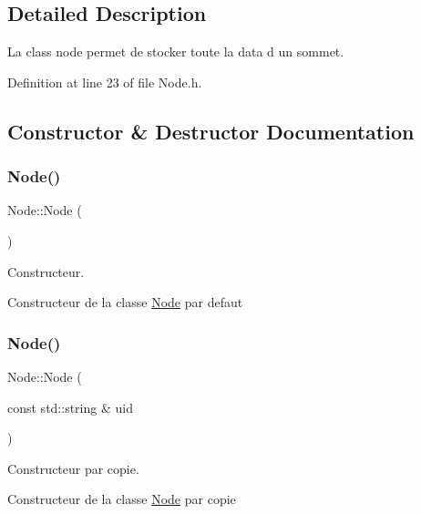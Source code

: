 \subsection{Detailed Description}
La class node permet de stocker toute la data d un sommet. 

Definition at line 23 of file Node.\+h.



\subsection{Constructor \& Destructor Documentation}
\mbox{\label{class_node_ad7a34779cad45d997bfd6d3d8043c75f}} 
\subsubsection{\texorpdfstring{Node()}{Node()}\hspace{0.1cm}{\footnotesize\ttfamily [1/3]}}
{\footnotesize\ttfamily Node\+::\+Node (\begin{DoxyParamCaption}{ }\end{DoxyParamCaption})}



Constructeur. 

Constructeur de la classe \mbox{\hyperlink{class_node}{Node}} par defaut \mbox{\label{class_node_a639cdb8009e80b20bfdb0575c765c713}} 
\subsubsection{\texorpdfstring{Node()}{Node()}\hspace{0.1cm}{\footnotesize\ttfamily [2/3]}}
{\footnotesize\ttfamily Node\+::\+Node (\begin{DoxyParamCaption}\item[{const std\+::string \&}]{uid }\end{DoxyParamCaption})}



Constructeur par copie. 

Constructeur de la classe \mbox{\hyperlink{class_node}{Node}} par copie \mbox{\label{class_node_a2d318229a996fe2654bf53428a4ff283}} 
